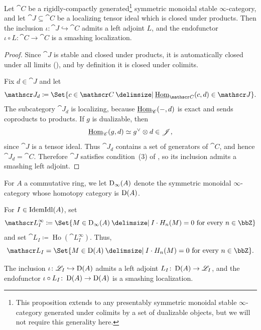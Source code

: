 \documentclass{amsart}
\begin{document}
        \begin{Prop}\label{prop:left-adjoint}
            Let $\cat C$ be a rigidly-compactly generated\footnote{This proposition extends to any presentably symmetric monoidal stable $\infty$-category generated under colimits by a set of dualizable objects, but we will not require this generality here.} symmetric monoidal stable $\infty$-category, and let $\cat J \subseteq\cat C$ be a localizing tensor ideal which is closed under products. 
            Then the inclusion $\iota \colon \cat J\hookrightarrow\cat C$ admits a left adjoint $L$, and the endofunctor $\iota \circ L \colon \cat C \to \cat C$ is a smashing localization.
        \end{Prop}
        \begin{proof}
            Since $\cat J$ is stable and closed under products, it is automatically closed under all limits (\cite[Proposition~1.4.4.1]{HALurie}), and by definition it is closed under colimits. 

            Fix $d\in\cat J$ and let
            \[
                \cat J_d \coloneqq \Set{c\in\cat C\given\underline{\Hom}_{\cat C}(c,d)\in\cat J}.
            \]
    The subcategory $\cat J_d$ is localizing, because
    $\underline{\operatorname{Hom}}_{\mathscr{C}}(-,d)$ is exact and sends coproducts to products. If $g$ is dualizable, then
    \[
        \underline{\operatorname{Hom}}_{\mathscr{C}}(g,d)\simeq g^\vee\otimes d\in\mathscr{J},
    \]
    since $\cat J$ is a tensor ideal. Thus $\cat J_d$ contains a set of
    generators of $\cat C$, and hence $\cat J_d=\cat C$.  Therefore $\cat J$ satisfies condition~(3) of \cite[Theorem~7.7]{RagimovSchlank2026Categorical}, so its inclusion admits a smashing left adjoint.
        \end{proof}
        \begin{Not}
            For $A$ a commutative ring, we let $\operatorname{D}_{\infty}(A)$ denote the symmetric monoidal $\infty$-category whose homotopy category is $\operatorname{D}(A)$. 
        \end{Not}
        \begin{Def}
            For $I \in \mathrm{IdemIdl}(A)$, set
            \[
            \cat L^{\infty}_I \coloneqq \Set{M \in \Der_{\infty}(A) \given I \cdot H_n(M) = 0 \text{ for every } n \in \bbZ}
            \]
            and set $\cat L_I \coloneqq \operatorname{Ho}(\cat L^{\infty}_I)$. Thus,
            \[
            \cat L_I = \Set{M \in \Der(A) \given I \cdot H_n(M) = 0 \text{ for every } n \in \bbZ}.
            \]
        \end{Def}
\begin{Prop}
    The inclusion $\iota\colon\mathscr{L}_I\hookrightarrow\operatorname{D}(A)$ admits a left adjoint $L_I\colon\operatorname{D}(A)\to\mathscr{L}_I$, and  the endofunctor $\iota \circ L_I \colon \operatorname{D}(A) \to  \operatorname{D}(A)$ is a smashing localization.
\end{Prop}
\end{document}
